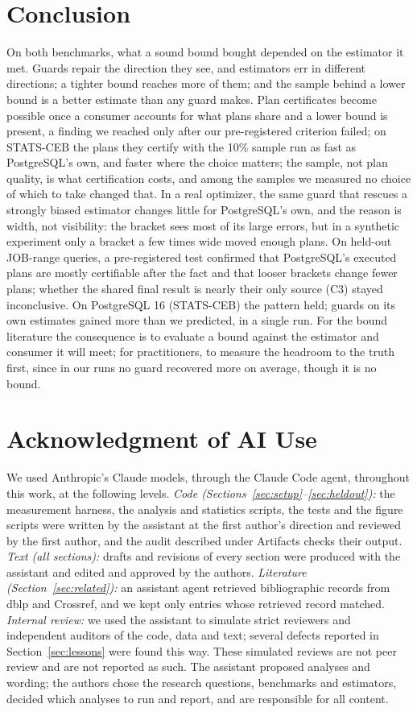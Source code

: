 \documentclass[sigconf, nonacm]{acmart}
\begin{document}
\section{Conclusion}
\label{sec:conclusion}
On both benchmarks, what a sound bound bought depended on the estimator it
met. Guards repair the direction they see, and estimators err in
different directions; a tighter bound reaches more of them; and the
sample behind a lower bound is a better estimate than any guard makes. Plan
certificates become possible once a consumer accounts for what plans share and
a lower bound is present, a finding we reached only after our pre-registered
criterion failed; on STATS-CEB the plans they certify with the 10\% sample run
as fast as PostgreSQL's own, and faster where the choice matters; the sample, not plan
quality, is what certification costs, and among the samples we measured no
choice of which to take changed that. In a real optimizer, the same guard that rescues a strongly biased
estimator changes little for PostgreSQL's own, and the reason is width, not
visibility: the bracket sees most of its large errors, but in a synthetic
experiment only a bracket a few times wide moved enough plans. On held-out
JOB-range queries, a pre-registered test confirmed that PostgreSQL's executed
plans are mostly certifiable after the fact and that looser brackets change
fewer plans; whether the shared final result is nearly their only source (C3)
stayed inconclusive. On PostgreSQL 16 (STATS-CEB) the pattern held; guards
on its own estimates gained more than we predicted, in a single run. For the bound literature the
consequence is to evaluate a bound against the estimator and consumer it will
meet; for practitioners, to measure the headroom to the truth first, since in
our runs no guard recovered more on average, though it is no bound.

\section*{Acknowledgment of AI Use}
We used Anthropic's Claude models, through the Claude Code agent, throughout
this work, at the following levels. \emph{Code (Sections~\ref{sec:setup}--\ref{sec:heldout}):} the
measurement harness, the analysis and statistics scripts, the tests and the
figure scripts were written by the assistant at the first author's direction and
reviewed by the first author, and the audit described under Artifacts
checks their output. \emph{Text (all sections):} drafts and revisions of every section
were produced with the assistant and edited and approved by the authors.
\emph{Literature (Section~\ref{sec:related}):} an assistant agent retrieved bibliographic
records from dblp and Crossref, and we kept only entries whose retrieved record
matched. \emph{Internal review:} we used the assistant to simulate strict
reviewers and independent auditors of the code, data and text; several defects
reported in Section~\ref{sec:lessons} were found this way. These simulated reviews are not
peer review and are not reported as such. The assistant proposed analyses and
wording; the authors chose the research questions, benchmarks and estimators,
decided which analyses to run and report, and are responsible for all content.
\end{document}
